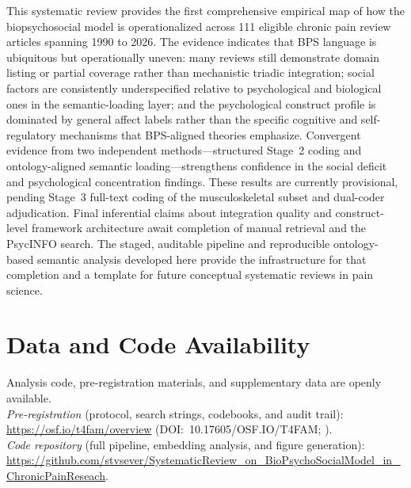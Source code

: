 \documentclass[11pt]{article}
\begin{document}
This systematic review provides the first comprehensive empirical map of how the biopsychosocial model is operationalized across 111 eligible chronic pain review articles spanning 1990 to 2026. The evidence indicates that BPS language is ubiquitous but operationally uneven: many reviews still demonstrate domain listing or partial coverage rather than mechanistic triadic integration; social factors are consistently underspecified relative to psychological and biological ones in the semantic-loading layer; and the psychological construct profile is dominated by general affect labels rather than the specific cognitive and self-regulatory mechanisms that BPS-aligned theories emphasize. Convergent evidence from two independent methods---structured Stage~2 coding and ontology-aligned semantic loading---strengthens confidence in the social deficit and psychological concentration findings. These results are currently provisional, pending Stage~3 full-text coding of the musculoskeletal subset and dual-coder adjudication. Final inferential claims about integration quality and construct-level framework architecture await completion of manual retrieval and the PsycINFO search. The staged, auditable pipeline and reproducible ontology-based semantic analysis developed here provide the infrastructure for that completion and a template for future conceptual systematic reviews in pain science.

\section*{Data and Code Availability}
\label{sec:datacode}

\begin{sloppypar}
Analysis code, pre-registration materials, and supplementary data are openly available.\\
\textit{Pre-registration} (protocol, search strings, codebooks, and audit trail):
\url{https://osf.io/t4fam/overview} (DOI:~10.17605/OSF.IO/T4FAM; \citealt{osfprotocol2026}).\\
\textit{Code repository} (full pipeline, embedding analysis, and figure generation):
\url{https://github.com/stvsever/SystematicReview_on_BioPsychoSocialModel_in_ChronicPainReseach}.
\end{sloppypar}



\end{document}
